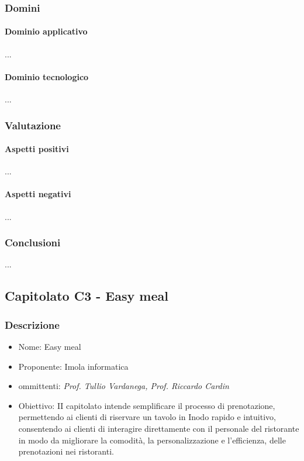 \documentclass[italian,12pt]{article} %
\begin{document}
\subsubsection{Domini}
\paragraph{Dominio applicativo}
...
\paragraph{Dominio tecnologico}
...

\subsubsection{Valutazione}
\paragraph{Aspetti positivi}
...
\paragraph{Aspetti negativi}
...

\subsubsection{Conclusioni}
...



\subsection{Capitolato C3 - Easy meal}

\subsubsection{Descrizione}
\begin{itemize}
	\item Nome: Easy meal
	\item Proponente: Imola informatica
	\item ommittenti: {\it Prof. Tullio Vardanega, Prof. Riccardo Cardin}
	\item Obiettivo: II capitolato intende semplificare il processo di prenotazione, permettendo ai clienti di riservare un tavolo in Inodo rapido e intuitivo, consentendo ai clienti di interagire direttamente con il personale del ristorante in modo da migliorare la comodità, la personalizzazione e l'efficienza, delle prenotazioni nei ristoranti.
\end{itemize}
\end{document}
